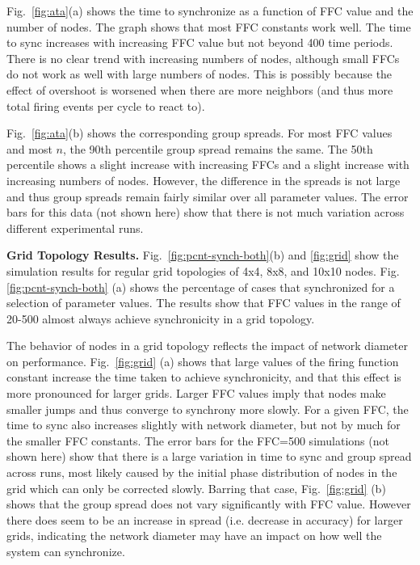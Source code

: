 \documentclass{sig-alternate}
\begin{document}
{Fig.~\ref{fig:ata}(a) shows the time to synchronize as a function of
FFC value and the number of nodes. The graph shows that most FFC
constants work well. The time to sync increases with increasing FFC
value but not beyond 400 time periods. There is no clear trend with
increasing numbers of nodes, although small FFCs do not work as well
with large numbers of nodes. This is possibly because the effect of
overshoot is worsened when there are more neighbors (and thus more
total firing events per cycle to react to).

Fig.~\ref{fig:ata}(b) shows the corresponding group spreads. For most
FFC values and most $n$, the 90th percentile group spread remains the
same. The 50th percentile shows a slight increase with increasing FFCs
and a slight increase with increasing numbers of nodes. However, the
difference in the spreads is not large and thus group spreads remain
fairly similar over all parameter values. The error bars for this data
(not shown here) show that there is not much variation across
different experimental runs.

{\bf Grid Topology Results.}  Fig.~\ref{fig:pcnt-synch-both}(b) and
\ref{fig:grid} show the simulation results for regular grid topologies
of 4x4, 8x8, and 10x10 nodes. Fig. \ref{fig:pcnt-synch-both} (a) shows
the percentage of cases that synchronized for a selection of parameter
values. The results show that FFC values in the range of 20-500 almost
always achieve synchronicity in a grid topology.

The behavior of nodes in a grid topology reflects the impact of
network diameter on performance. Fig.~\ref{fig:grid} (a) shows that
large values of the firing function constant increase the time taken
to achieve synchronicity, and that this effect is more pronounced for
larger grids. Larger FFC values imply that nodes make smaller jumps
and thus converge to synchrony more slowly. For a given FFC, the time
to sync also increases slightly with network diameter, but not by much
for the smaller FFC constants. The error bars for the FFC=500
simulations (not shown here) show that there is a large variation in
time to sync and group spread across runs, most likely caused by the
initial phase distribution of nodes in the grid which can only be
corrected slowly. Barring that case, Fig.~\ref{fig:grid} (b) shows
that the group spread does not vary significantly with FFC
value. However there does seem to be an increase in spread
(i.e. decrease in accuracy) for larger grids, indicating the network
diameter may have an impact on how well the system can synchronize.

}
\end{document}
